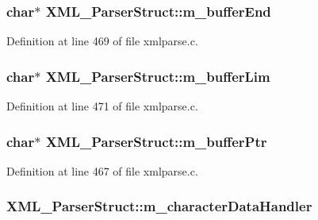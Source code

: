 \subsubsection[{\texorpdfstring{m\+\_\+buffer\+End}{m_bufferEnd}}]{\setlength{\rightskip}{0pt plus 5cm}char$\ast$ X\+M\+L\+\_\+\+Parser\+Struct\+::m\+\_\+buffer\+End}\hypertarget{struct_x_m_l___parser_struct_a0ba4eb2c181cd3915f388e29b5397880}{}\label{struct_x_m_l___parser_struct_a0ba4eb2c181cd3915f388e29b5397880}


Definition at line 469 of file xmlparse.\+c.

\subsubsection[{\texorpdfstring{m\+\_\+buffer\+Lim}{m_bufferLim}}]{ char$\ast$ X\+M\+L\+\_\+\+Parser\+Struct\+::m\+\_\+buffer\+Lim}\hypertarget{struct_x_m_l___parser_struct_ab937e44980d37e6e8aba68e9697560fa}{}\label{struct_x_m_l___parser_struct_ab937e44980d37e6e8aba68e9697560fa}


Definition at line 471 of file xmlparse.\+c.

\subsubsection[{\texorpdfstring{m\+\_\+buffer\+Ptr}{m_bufferPtr}}]{ char$\ast$ X\+M\+L\+\_\+\+Parser\+Struct\+::m\+\_\+buffer\+Ptr}\hypertarget{struct_x_m_l___parser_struct_adb5c77046a556bc04f3b57033cafbee8}{}\label{struct_x_m_l___parser_struct_adb5c77046a556bc04f3b57033cafbee8}


Definition at line 467 of file xmlparse.\+c.

\subsubsection[{\texorpdfstring{m\+\_\+character\+Data\+Handler}{m_characterDataHandler}}]{ X\+M\+L\+\_\+\+Parser\+Struct\+::m\+\_\+character\+Data\+Handler}\hypertarget{struct_x_m_l___parser_struct_ae0b82e8ee9b1917e4985d2414a971cff}{}\label{struct_x_m_l___parser_struct_ae0b82e8ee9b1917e4985d2414a971cff}


